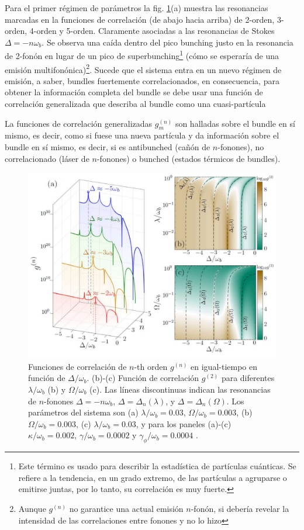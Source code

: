\documentclass[../main.tex]{subfiles}
\begin{document}
Para el primer régimen de parámetros la fig. \ref{fig:correlationbundle}(a) muestra las resonancias marcadas en la funciones de correlación (de abajo hacia arriba) de 2-orden, 3-orden, 4-orden y 5-orden. Claramente asociadas a las resonancias de Stokes $\Delta = -n\omega_b$. Se observa una caída dentro del pico bunching justo en la resonancia de 2-fonón en lugar de un pico de superbunching\footnote{Este término es usado para describir la estadística de partículas cuánticas. Se refiere a la tendencia, en un grado extremo, de las partículas a agruparse o emitirse juntas, por lo tanto, su correlación es muy fuerte.} (cómo se esperaría de una emisión multifonónica)\footnote{Aunque $g^{(n)}$ no garantice una actual emisión $n$-fonón, si debería revelar la intensidad de las correlaciones entre fonones y no lo hizo}. Sucede que el sistema entra en un nuevo régimen de emisión, a saber, bundles fuertemente correlacionados, en consecuencia,  para obtener la información completa del bundle se debe usar una función de correlación generalizada que describa al bundle como una cuasi-partícula

La funciones de correlación generalizadas $g_m^{(n)}$  son halladas sobre el bundle en sí mismo, es decir, como si fuese una nueva partícula y  da información sobre el bundle en sí mismo, es decir, si es antibunched (cañón de $n$-fonones), no correlacionado (láser de $n$-fonones) o bunched (estados térmicos de  bundles).

\begin{figure}[th]
	\centering
	\includegraphics[width=0.8\linewidth]{img/correlationBundle}
	\caption{Funciones de correlación de $n$-th orden $g^{(n)}$ en igual-tiempo en función de $\Delta/\omega_b$. (b)-(c) Función de correlación $g^{(2)}$ para diferentes $\lambda/\omega_b$ (b) y $\Omega/\omega_b$ (c). Las líneas discontinuas indican las resonancias de $n$-fonones $\Delta=-n\omega_b$, $\Delta= \Delta_n(\lambda)$, y $\Delta = \Delta_n(\Omega)$. Los parámetros del sistema son (a) $\lambda/\omega_b= 0.03$, $\Omega/\omega_b = 0.003$, (b) $\Omega/\omega_b = 0.003$, (c) $\lambda/\omega_b = 0.03$, y  para los paneles (a)-(c) $\kappa/\omega_b = 0.002$, $\gamma/\omega_b = 0.0002$ y $\gamma_\phi/\omega_b = 0.0004$ \parencite{Bin2020}.}
	\label{fig:correlationbundle}
\end{figure}
\end{document}
